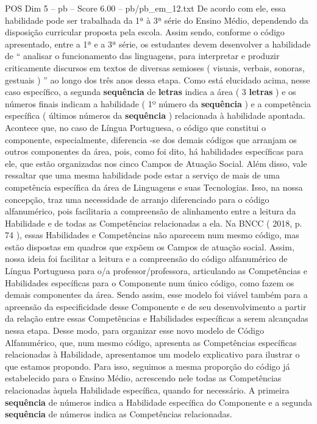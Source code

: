 \begin{textsample}{POS Dim 5 – pb – Score 6.00 – pb/pb\_em\_12.txt}
De acordo com ele, essa habilidade pode ser trabalhada da 1ª à 3ª série do Ensino Médio, dependendo da disposição curricular proposta pela escola.
Assim sendo, conforme o código apresentado, entre a 1ª e a 3ª série, os estudantes devem desenvolver a habilidade de “ analisar o funcionamento das linguagens, para interpretar e produzir criticamente discursos em textos de diversas semioses ( visuais, verbais, sonoras, gestuais ) ” ao longo dos três anos dessa etapa.
Como está elucidado acima, nesse caso específico, a segunda \textbf{sequência} de \textbf{letras} indica a área ( 3 \textbf{letras} ) e os números finais indicam a habilidade ( 1º número da \textbf{sequência} ) e a competência específica ( últimos números da \textbf{sequência} ) relacionada à habilidade apontada.
Acontece que, no caso de Língua Portuguesa, o código que constitui o componente, especialmente, diferencia -se dos demais códigos que arranjam os outros componentes da área, pois, como foi dito, há habilidades específicas para ele, que estão organizadas nos cinco Campos de Atuação Social.
Além disso, vale ressaltar que uma mesma habilidade pode estar a serviço de mais de uma competência específica da área de Linguagens e suas Tecnologias.
Isso, na nossa concepção, traz uma necessidade de arranjo diferenciado para o código alfanumérico, pois facilitaria a compreensão de alinhamento entre a leitura da Habilidade e de todas as Competências relacionadas a ela.
Na BNCC ( 2018, p. 74 ), essas Habilidades e Competências não aparecem num mesmo código, mas estão dispostas em quadros que expõem os Campos de atuação social.
Assim, nossa ideia foi facilitar a leitura e a compreensão do código alfanumérico de Língua Portuguesa para o/a professor/professora, articulando as Competências e Habilidades específicas para o Componente num único código, como fazem os demais componentes da área.
Sendo assim, esse modelo foi viável também para a apreensão da especificidade desse Componente e de seu desenvolvimento a partir da relação entre essas Competências e Habilidades específicas a serem alcançadas nessa etapa.
Desse modo, para organizar esse novo modelo de Código Alfanumérico, que, num mesmo código, apresenta as Competências específicas relacionadas à Habilidade, apresentamos um modelo explicativo para ilustrar o que estamos propondo.
Para isso, seguimos a mesma proporção do código já estabelecido para o Ensino Médio, acrescendo nele todas as Competências relacionadas àquela Habilidade específica, quando for necessário.
A primeira \textbf{sequência} de números indica a Habilidade específica do Componente e a segunda \textbf{sequência} de números indica as Competências relacionadas.

\end{textsample}
